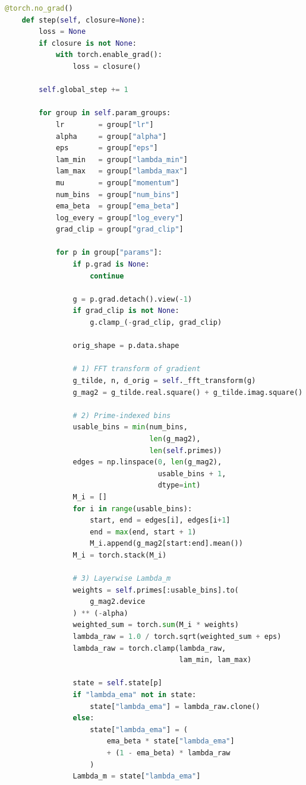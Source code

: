 \documentclass[11pt]{article}
\begin{document}
\begin{lstlisting}[style=code,language=Python]
    @torch.no_grad()
    def step(self, closure=None):
        loss = None
        if closure is not None:
            with torch.enable_grad():
                loss = closure()

        self.global_step += 1

        for group in self.param_groups:
            lr        = group["lr"]
            alpha     = group["alpha"]
            eps       = group["eps"]
            lam_min   = group["lambda_min"]
            lam_max   = group["lambda_max"]
            mu        = group["momentum"]
            num_bins  = group["num_bins"]
            ema_beta  = group["ema_beta"]
            log_every = group["log_every"]
            grad_clip = group["grad_clip"]

            for p in group["params"]:
                if p.grad is None:
                    continue

                g = p.grad.detach().view(-1)
                if grad_clip is not None:
                    g.clamp_(-grad_clip, grad_clip)

                orig_shape = p.data.shape

                # 1) FFT transform of gradient
                g_tilde, n, d_orig = self._fft_transform(g)
                g_mag2 = g_tilde.real.square() + g_tilde.imag.square()

                # 2) Prime-indexed bins
                usable_bins = min(num_bins,
                                  len(g_mag2),
                                  len(self.primes))
                edges = np.linspace(0, len(g_mag2),
                                    usable_bins + 1,
                                    dtype=int)
                M_i = []
                for i in range(usable_bins):
                    start, end = edges[i], edges[i+1]
                    end = max(end, start + 1)
                    M_i.append(g_mag2[start:end].mean())
                M_i = torch.stack(M_i)

                # 3) Layerwise Lambda_m
                weights = self.primes[:usable_bins].to(
                    g_mag2.device
                ) ** (-alpha)
                weighted_sum = torch.sum(M_i * weights)
                lambda_raw = 1.0 / torch.sqrt(weighted_sum + eps)
                lambda_raw = torch.clamp(lambda_raw,
                                         lam_min, lam_max)

                state = self.state[p]
                if "lambda_ema" not in state:
                    state["lambda_ema"] = lambda_raw.clone()
                else:
                    state["lambda_ema"] = (
                        ema_beta * state["lambda_ema"]
                        + (1 - ema_beta) * lambda_raw
                    )
                Lambda_m = state["lambda_ema"]


\end{lstlisting}
\end{document}
